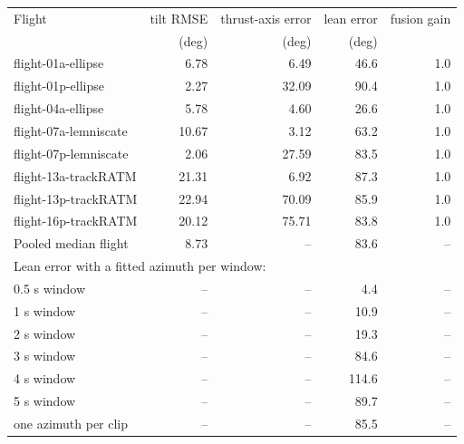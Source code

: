 \footnotesize
\begin{tabular}{lrrrr}
\toprule
Flight & tilt RMSE & thrust-axis error & lean error & fusion gain \\
 & (deg) & (deg) & (deg) & \\
\midrule
flight-01a-ellipse & 6.78 & 6.49 & 46.6 & 1.0 \\
flight-01p-ellipse & 2.27 & 32.09 & 90.4 & 1.0 \\
flight-04a-ellipse & 5.78 & 4.60 & 26.6 & 1.0 \\
flight-07a-lemniscate & 10.67 & 3.12 & 63.2 & 1.0 \\
flight-07p-lemniscate & 2.06 & 27.59 & 83.5 & 1.0 \\
flight-13a-trackRATM & 21.31 & 6.92 & 87.3 & 1.0 \\
flight-13p-trackRATM & 22.94 & 70.09 & 85.9 & 1.0 \\
flight-16p-trackRATM & 20.12 & 75.71 & 83.8 & 1.0 \\
\midrule
Pooled median flight & 8.73 & -- & 83.6 & -- \\
\midrule
\multicolumn{5}{l}{\footnotesize Lean error with a fitted azimuth per window:} \\
0.5 s window & -- & -- & 4.4 & -- \\
1 s window & -- & -- & 10.9 & -- \\
2 s window & -- & -- & 19.3 & -- \\
3 s window & -- & -- & 84.6 & -- \\
4 s window & -- & -- & 114.6 & -- \\
5 s window & -- & -- & 89.7 & -- \\
one azimuth per clip & -- & -- & 85.5 & -- \\
\bottomrule
\end{tabular}
